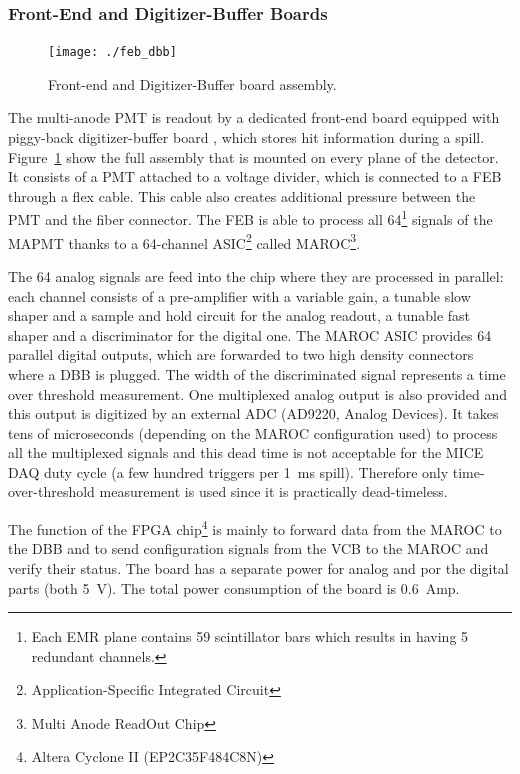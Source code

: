 \documentclass[a4paper,11pt]{article}
\begin{document}
\subsubsection{Front-End and Digitizer-Buffer Boards}
\begin{figure}[htp!]
 \centering
 \texttt{[image: ./feb\_dbb]}
 \caption[Front-end and buffer board assembly]{Front-end and Digitizer-Buffer board assembly.}
 \label{fig:feb_dbb}
\end{figure}

The multi-anode PMT is readout by a dedicated front-end board equipped with piggy-back digitizer-buffer board \cite{Bolognini2011108}, which stores
hit information during a spill. Figure~\ref{fig:feb_dbb} show the full assembly that is mounted on every plane of the detector. It consists of a PMT
attached to a voltage divider, which is connected to a FEB through a flex cable. This cable also creates additional pressure between the PMT and
the fiber connector. The FEB is able to process all 64\footnote{Each EMR plane contains 59 scintillator bars which results in having 5 redundant
channels.} signals of the MAPMT thanks to a 64-channel ASIC\footnote{Application-Specific Integrated Circuit} called MAROC\footnote{Multi Anode
ReadOut Chip}\cite{maroc}.

The 64 analog signals are feed into the chip where they are processed in parallel: each channel consists of a pre-amplifier with a variable gain,
a tunable slow shaper and a sample and hold circuit for the analog readout, a tunable fast shaper and a discriminator for the digital one.
The MAROC ASIC provides 64 parallel digital outputs, which are forwarded to two high density connectors where a DBB is plugged. The width of the
discriminated signal represents a time over threshold measurement. One multiplexed analog output is also provided and this output is digitized by
an external ADC (AD9220, Analog Devices). It takes tens of microseconds (depending on the MAROC configuration used) to process all the multiplexed signals
and this dead time is not acceptable for the MICE DAQ duty cycle (a few hundred triggers per 1~ms spill). Therefore only time-over-threshold
measurement is used since it is practically dead-timeless.

The function of the FPGA chip\footnote{Altera Cyclone II (EP2C35F484C8N)} is mainly to forward data from the MAROC to the DBB and to send configuration
signals from the VCB to the MAROC and verify their status. The board has a separate power for analog and por the digital parts (both 5~V). The total
power consumption of the board is 0.6~Amp.
\end{document}
